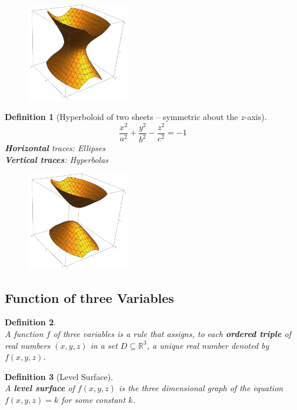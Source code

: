 \documentclass[12pt]{article}
\newtheorem{definition}{Definition}[section]
\theoremstyle{definition}
\begin{document}
\begin{figure}[h]
\centering
\includegraphics[width = 0.4\textwidth]{2_5.png}
\end{figure}
\begin{definition}[Hyperboloid of two sheets -- symmetric about the $z$-axis]
\hfill\\\normalfont
\[
\frac{x^2}{a^2}+\frac{y^2}{b^2}-\frac{z^2}{c^2}=-1
\]
\textbf{Horizontal} traces: Ellipses\\
\textbf{Vertical traces}: Hyperbolas
\end{definition}
\begin{figure}[h]
\centering
\includegraphics[width = 0.4\textwidth]{2_6.png}
\end{figure}
\subsection{Function of three Variables}
\begin{definition}\hfill\\\normalfont A function $f$ of three variables is a rule that assigns, to each \textbf{ordered triple} of real numbers $(x,y,z)$ in a set $D\subseteq \mathbb{R}^3$, a \textit{unique} real number denoted by $f(x,y,z)$.
\end{definition}
\begin{definition}[Level Surface]\hfill\\\normalfont A \textbf{level surface} of $f(x,y,z)$ is the three dimensional graph of the equation $f(x,y,z)=k$ for some constant $k$.
\end{definition}
\end{document}
